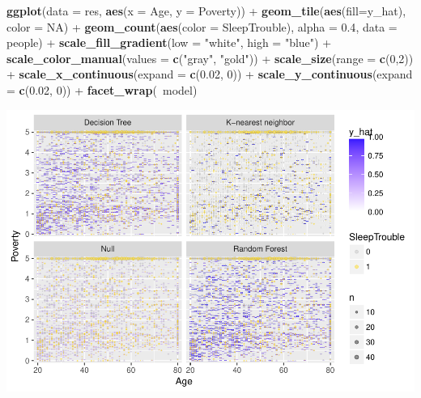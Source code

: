 \documentclass[]{article}
\newenvironment{Shaded}{\begin{snugshade}}{\end{snugshade}}
\newcommand{\KeywordTok}[1]{\textcolor[rgb]{0.13,0.29,0.53}{\textbf{{#1}}}}
\newcommand{\DataTypeTok}[1]{\textcolor[rgb]{0.13,0.29,0.53}{{#1}}}
\newcommand{\DecValTok}[1]{\textcolor[rgb]{0.00,0.00,0.81}{{#1}}}
\newcommand{\FloatTok}[1]{\textcolor[rgb]{0.00,0.00,0.81}{{#1}}}
\newcommand{\StringTok}[1]{\textcolor[rgb]{0.31,0.60,0.02}{{#1}}}
\newcommand{\OtherTok}[1]{\textcolor[rgb]{0.56,0.35,0.01}{{#1}}}
\newcommand{\NormalTok}[1]{{#1}}
\begin{document}
\begin{Shaded}
\begin{Highlighting}[]
\KeywordTok{ggplot}\NormalTok{(}\DataTypeTok{data =} \NormalTok{res, }\KeywordTok{aes}\NormalTok{(}\DataTypeTok{x =} \NormalTok{Age, }\DataTypeTok{y =} \NormalTok{Poverty)) +}
\StringTok{  }\KeywordTok{geom_tile}\NormalTok{(}\KeywordTok{aes}\NormalTok{(}\DataTypeTok{fill=}\NormalTok{y_hat), }\DataTypeTok{color =} \OtherTok{NA}\NormalTok{) +}
\StringTok{  }\KeywordTok{geom_count}\NormalTok{(}\KeywordTok{aes}\NormalTok{(}\DataTypeTok{color =} \NormalTok{SleepTrouble), }\DataTypeTok{alpha =} \FloatTok{0.4}\NormalTok{, }\DataTypeTok{data =} \NormalTok{people) +}
\StringTok{  }\KeywordTok{scale_fill_gradient}\NormalTok{(}\DataTypeTok{low =} \StringTok{"white"}\NormalTok{, }\DataTypeTok{high =} \StringTok{"blue"}\NormalTok{) +}
\StringTok{  }\KeywordTok{scale_color_manual}\NormalTok{(}\DataTypeTok{values =} \KeywordTok{c}\NormalTok{(}\StringTok{"gray"}\NormalTok{, }\StringTok{"gold"}\NormalTok{)) +}
\StringTok{  }\KeywordTok{scale_size}\NormalTok{(}\DataTypeTok{range =} \KeywordTok{c}\NormalTok{(}\DecValTok{0}\NormalTok{,}\DecValTok{2}\NormalTok{)) +}
\StringTok{  }\KeywordTok{scale_x_continuous}\NormalTok{(}\DataTypeTok{expand =} \KeywordTok{c}\NormalTok{(}\FloatTok{0.02}\NormalTok{, }\DecValTok{0}\NormalTok{)) +}
\StringTok{  }\KeywordTok{scale_y_continuous}\NormalTok{(}\DataTypeTok{expand =} \KeywordTok{c}\NormalTok{(}\FloatTok{0.02}\NormalTok{, }\DecValTok{0}\NormalTok{)) +}
\StringTok{  }\KeywordTok{facet_wrap}\NormalTok{(~model)}
\end{Highlighting}
\end{Shaded}

\includegraphics{Hmwk7AnswerKey_files/figure-latex/unnamed-chunk-15-1.pdf}
\end{document}
